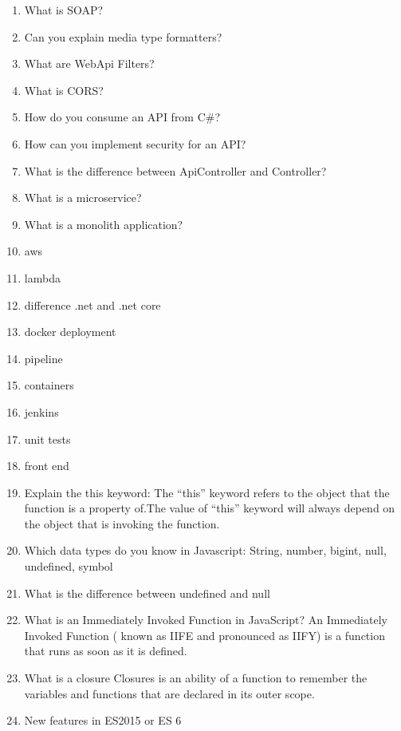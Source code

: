 \begin{multicols}{2}
\begin{enumerate}
\item What is SOAP?
\item Can you explain media type formatters?
\item What are WebApi Filters?
\item What is CORS?
\item How do you consume an API from C\#?
\item How can you implement security for an API?
\item What is the difference between ApiController and Controller?
\item What is a microservice?
\item What is a monolith application?
\item aws
\item lambda
\item difference .net and .net core
\item docker deployment
\item pipeline
\item containers
\item jenkins
\item unit tests
\item front end
\item Explain the this keyword: The “this” keyword refers to the object that the function is a property of.The value of “this” keyword will always depend on the object that is invoking the function.
\item Which data types do you know in Javascript: String, number, bigint, null, undefined, symbol
\item What is the difference between undefined and null
\item What is an Immediately Invoked Function in JavaScript? An Immediately Invoked Function ( known as IIFE and pronounced as IIFY) is a function that runs as soon as it is defined.
\item What is a closure Closures is an ability of a function to remember the variables and functions that are declared in its outer scope.
\item New features in ES2015 or ES 6
\end{enumerate}
\end{multicols}
